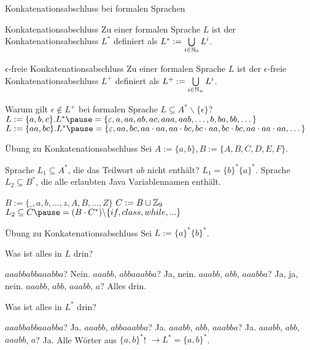 \begin{frame}{Konkatenationsabschluss bei formalen Sprachen}
	\p
	\begin{block}{Konkatenationsabschluss}
		Zu einer formalen Sprache $L$ \pause ist der Konkatenationsabschluss $L^*$ definiert \pause als $L^* := \bigcup\limits_{i \in \mathbb{N}_0} L^i$.
	\end{block}
	\p
	\begin{block}{$\epsilon$-freie Konkatenationsabschluss}
		Zu einer formalen Sprache $L$ \pause ist der $\epsilon$-freie Konkatenationsabschluss $L^+$ definiert \pause als $L^+ := \bigcup\limits_{i \in \mathbb{N}_+} L^i$.
	\end{block}

	\begin{itemize}
		\pitem Warum gilt $\epsilon \notin L^+$ bei formalen Sprache $L \subseteq A^* \backslash \{\epsilon\}$?
		\pitem $L := \{a, b, c\}.  L^* \pause = \{\epsilon, a, aa, ab, ac, aaa, aab, \dots, b, ba, bb, \dots \}$
		\pitem $L := \{aa, bc\}.  L^* \pause = \{\epsilon, aa, bc, aa\cdot aa, aa\cdot bc, bc \cdot aa, bc \cdot bc, aa \cdot aa \cdot aa, \dots \}$
	\end{itemize}
\end{frame}

\begin{frame}{Übung zu Konkatenationsabschluss}
	Sei $A := \{a, b\}, B := \{A, B, C, D, E, F\}$.
	\begin{itemize}
		\pitem Sprache $L_1 \subseteq A^*$, die das Teilwort $ab$ nicht enthält? \pause $L_1 = \{b\}^*\{a\}^*$.
		\pitem Sprache $L_2 \subseteq B^*$, die alle erlaubten Java Variablennamen enthält.
		\begin{itemize}
			\pitem $B := \{\_,a,b,...,z,A,B,...,Z\}$
			\pitem $C := B \cup \mathbb{Z}_9$
			\pitem $L_2 \subseteq C \pause = (B \cdot C^*) \backslash \{if, class, while, ...\}$
		\end{itemize}
	\end{itemize}
\end{frame}

\begin{frame}{Übung zu Konkatenationsabschluss}
	\pause Sei $L := \{a\}^*\{b\}^*$.
	\begin{itemize}
		\pitem Was ist alles in $L$ drin?
		\begin{itemize}
			\pitem $aaabbabbaaabba$? \pause Nein.
			\pitem $aaabb$, $abbaaabba$? \pause Ja, nein.
			\pitem $aaabb$, $abb$, $aaabba$? \pause Ja, ja, nein.
			\pitem $aaabb$, $abb$, $aaabb$, $a$? \pause Alles drin.
		\end{itemize}
		\pitem Was ist alles in $L^*$ drin?
		\begin{itemize}
			\pitem $aaabbabbaaabba$? \pause Ja.
			\pitem $aaabb$, $abbaaabba$? \pause Ja.
			\pitem $aaabb$, $abb$, $aaabba$? \pause Ja.
			\pitem $aaabb$, $abb$, $aaabb$, $a$? \pause Ja.
			\pitem Alle Wörter aus $\{a,b\}^*$! \pause $\rightarrow L^* = \{a,b\}^*$.
		\end{itemize}
	\end{itemize}
\end{frame}

